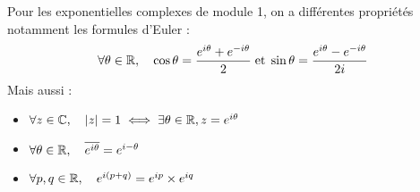 \begin{proposition}
    Pour les exponentielles complexes de module 1, on a différentes propriétés notamment les formules d'Euler : 
        \[ \forall \theta \in \mathbb{R}, \quad \cos \theta = \frac{e^{i\theta} + e^{-i\theta}}{2} \; \text{et} \; \sin \theta = \frac{e^{i\theta} - e^{-i\theta}}{2i} \] 
    Mais aussi :
    \begin{itemize}
        \item $ \forall z \in \mathbb{C}, \quad |z| = 1 \iff \exists \theta \in \mathbb{R}, z = e^{i\theta} $ 
        \item $ \forall \theta \in \mathbb{R}, \quad \overline{e^{i\theta}} = e^{i-\theta} $ 
        \item $ \forall p,q \in \mathbb{R}, \quad e^{i (p+q)} = e^{ip} \times e^{iq} $ 
    \end{itemize} 
\end{proposition}















